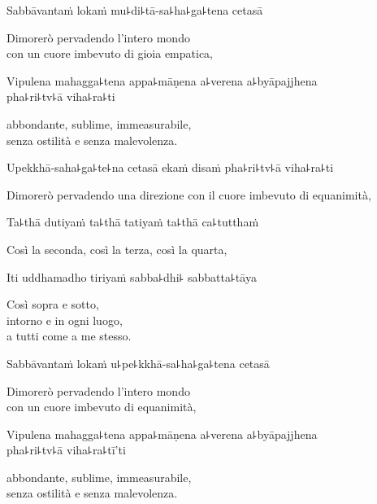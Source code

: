 Sabbāvantaṁ lokaṁ mu꜕di꜕tā-sa꜕ha꜕ga꜕tena cetasā\\

\begin{english} 
Dimorerò pervadendo l'intero mondo\\
 con un cuore imbevuto di gioia empatica,
  \end{english}


Vipulena mahagga꜕tena appa꜕māṇena a꜕verena a꜕byāpajjhena\\
pha꜕ri꜕tv꜕ā viha꜕ra꜕ti

  \begin{english} 
abbondante, sublime, immeasurabile,\\
senza ostilità e senza malevolenza.
  \end{english}


Upekkhā-saha꜕ga꜕te꜕na cetasā ekaṁ disaṁ pha꜕ri꜕tv꜕ā viha꜕ra꜕ti\\

\begin{english}
Dimorerò pervadendo una direzione con il cuore imbevuto di equanimità,
  \end{english}

Ta꜕thā dutiyaṁ ta꜕thā tatiyaṁ ta꜕thā ca꜕tutthaṁ\\

\begin{english}
Così la seconda, così la terza, così la quarta,
  \end{english}

  Iti uddhamadho tiriyaṁ sabba꜕dhi꜕ sabbatta꜕tāya\\

\begin{english} 
  Così sopra e sotto,\\
   intorno e in ogni luogo,\\
   a tutti come a me stesso.
  \end{english}

  Sabbāvantaṁ lokaṁ u꜕pe꜕kkhā-sa꜕ha꜕ga꜕tena cetasā\\

  \begin{english} 
Dimorerò pervadendo l'intero mondo\\  
con un cuore imbevuto di equanimità,
  \end{english}

  Vipulena mahagga꜕tena appa꜕māṇena a꜕verena a꜕byāpajjhena\\
  \vin pha꜕ri꜕tv꜕ā viha꜕ra꜕tī'ti

  \begin{english}
abbondante, sublime, immeasurabile,\\ 
senza ostilità e senza malevolenza.
  \end{english}


